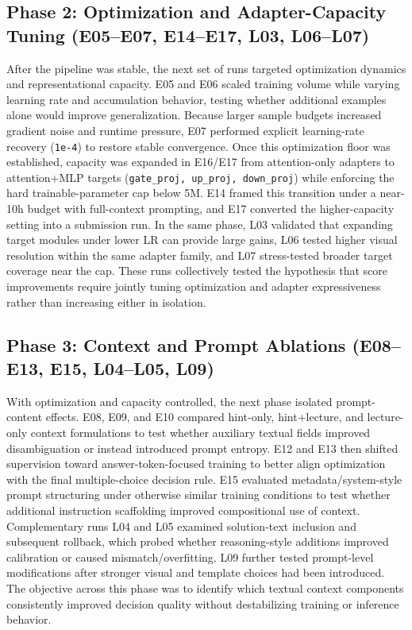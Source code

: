 \documentclass[11pt]{article}
\begin{document}
\subsection*{Phase 2: Optimization and Adapter-Capacity Tuning (E05--E07, E14--E17, L03, L06--L07)}
After the pipeline was stable, the next set of runs targeted optimization dynamics and representational capacity. E05 and E06 scaled training volume while varying learning rate and accumulation behavior, testing whether additional examples alone would improve generalization. Because larger sample budgets increased gradient noise and runtime pressure, E07 performed explicit learning-rate recovery (\texttt{1e-4}) to restore stable convergence. Once this optimization floor was established, capacity was expanded in E16/E17 from attention-only adapters to attention+MLP targets (\texttt{gate\_proj, up\_proj, down\_proj}) while enforcing the hard trainable-parameter cap below 5M. E14 framed this transition under a near-10h budget with full-context prompting, and E17 converted the higher-capacity setting into a submission run. In the same phase, L03 validated that expanding target modules under lower LR can provide large gains, L06 tested higher visual resolution within the same adapter family, and L07 stress-tested broader target coverage near the cap. These runs collectively tested the hypothesis that score improvements require jointly tuning optimization and adapter expressiveness rather than increasing either in isolation.

\subsection*{Phase 3: Context and Prompt Ablations (E08--E13, E15, L04--L05, L09)}
With optimization and capacity controlled, the next phase isolated prompt-content effects. E08, E09, and E10 compared hint-only, hint+lecture, and lecture-only context formulations to test whether auxiliary textual fields improved disambiguation or instead introduced prompt entropy. E12 and E13 then shifted supervision toward answer-token-focused training to better align optimization with the final multiple-choice decision rule. E15 evaluated metadata/system-style prompt structuring under otherwise similar training conditions to test whether additional instruction scaffolding improved compositional use of context. Complementary runs L04 and L05 examined solution-text inclusion and subsequent rollback, which probed whether reasoning-style additions improved calibration or caused mismatch/overfitting. L09 further tested prompt-level modifications after stronger visual and template choices had been introduced. The objective across this phase was to identify which textual context components consistently improved decision quality without destabilizing training or inference behavior.
\end{document}
